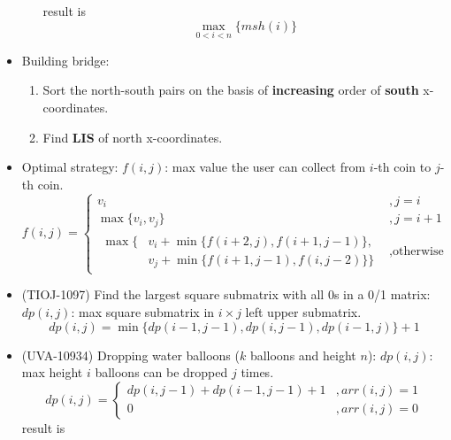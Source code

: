 \begin{itemize}
\begin{enumerate}
\begin{equation}
        \end{equation} result is \begin{equation}
            \max_{0 < i < n}\{msh(i)\}
        \end{equation}
    \end{enumerate}
    \item Building bridge: \begin{enumerate}
        \item Sort the north-south pairs on the basis of \textbf{increasing} order of \textbf{south} x-coordinates.
        \item Find \textbf{LIS} of north x-coordinates.
    \end{enumerate}
    \item Optimal strategy: $f(i, j)$: max value the user can collect from $i$-th coin to $j$-th coin.\begin{equation}
        f(i, j) = \begin{cases}
            v_i &, j = i \\
            \max\{v_i, v_j\} &, j = i + 1 \\
            \begin{aligned}
                \max\{& v_i + \min\{f(i + 2, j), f(i + 1, j -1)\}, \\
                & v_j + \min\{f(i + 1, j -1), f(i, j - 2)\}\}
            \end{aligned} &, \text{otherwise}
        \end{cases}
    \end{equation}
    \item (TIOJ-1097) Find the largest square submatrix with all 0s in a 0/1 matrix: $dp(i, j)$: max square submatrix in $i \times j$ left upper submatrix. \begin{equation}
        dp(i, j) = \min\{dp(i − 1, j − 1), dp(i, j − 1), dp(i − 1,j)\} + 1
    \end{equation} 
    \item (UVA-10934) Dropping water balloons ($k$ balloons and height $n$): $dp(i, j)$: max height $i$ balloons can be dropped $j$ times. \begin{equation}
        dp(i, j) = \begin{cases}
            dp(i, j - 1) + dp(i - 1, j - 1) + 1 &, arr(i, j) = 1 \\
            0 &, arr(i, j) = 0
        \end{cases}
    \end{equation} result is \begin{equation}

\end{equation}
\end{itemize}
